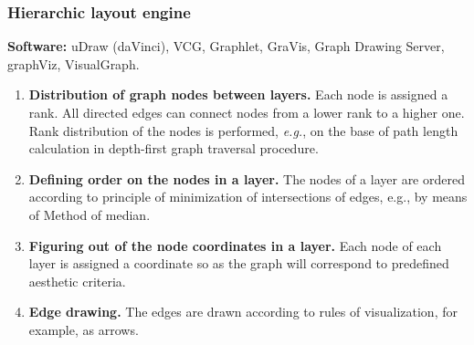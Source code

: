 \documentclass{beamer}
\begin{document}
\begin{frame}
\frametitle{Hierarchic layout engine}
\textbf{Software:} uDraw (daVinci), VCG, Graphlet, GraVis, Graph Drawing Server, graphViz, VisualGraph.
\begin{enumerate}
\item \textbf{Distribution of graph nodes between layers.} Each node is assigned a rank.  All directed edges can connect nodes from a lower rank to a higher one.  Rank distribution of the nodes is performed, \emph{e.g.}, on the base of path length calculation in depth-first graph traversal procedure.
\item \textbf{Defining order on the nodes in a layer.} The nodes of a layer are ordered according to principle of minimization of intersections of edges, e.g., by means of Method of median.
\item \textbf{Figuring out of the node coordinates in a layer.} Each node of each layer is assigned a coordinate so as the graph will correspond to predefined aesthetic criteria.
\item \textbf{Edge drawing.} The edges are drawn according to rules of visualization, for example, as arrows.
\end{enumerate}
\end{frame}

\end{document}
